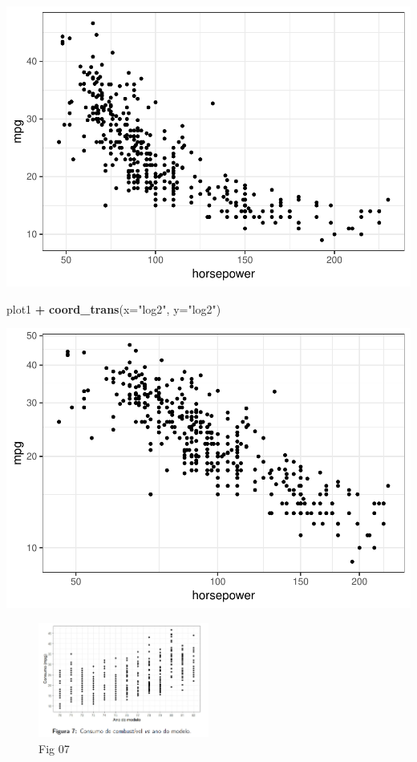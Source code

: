\documentclass[
]{article}
\newenvironment{Shaded}{\begin{snugshade}}{\end{snugshade}}
\newcommand{\AttributeTok}[1]{\textcolor[rgb]{0.13,0.29,0.53}{#1}}
\newcommand{\FunctionTok}[1]{\textcolor[rgb]{0.13,0.29,0.53}{\textbf{#1}}}
\newcommand{\NormalTok}[1]{#1}
\newcommand{\SpecialCharTok}[1]{\textcolor[rgb]{0.81,0.36,0.00}{\textbf{#1}}}
\newcommand{\StringTok}[1]{\textcolor[rgb]{0.31,0.60,0.02}{#1}}
\begin{document}
\includegraphics{Modelos_Estatisticos-2024-08-10_files/figure-latex/unnamed-chunk-4-1.pdf}

\begin{Shaded}
\begin{Highlighting}[]
\NormalTok{plot1 }\SpecialCharTok{+} \FunctionTok{coord\_trans}\NormalTok{(}\AttributeTok{x=}\StringTok{"log2"}\NormalTok{, }\AttributeTok{y=}\StringTok{"log2"}\NormalTok{)}
\end{Highlighting}
\end{Shaded}

\includegraphics{Modelos_Estatisticos-2024-08-10_files/figure-latex/unnamed-chunk-4-2.pdf}

\begin{figure}
\centering
\includegraphics[width=0.5\textwidth,height=\textheight]{2024-08-10-fig7.png}
\caption{Fig 07}
\end{figure}
\end{document}
